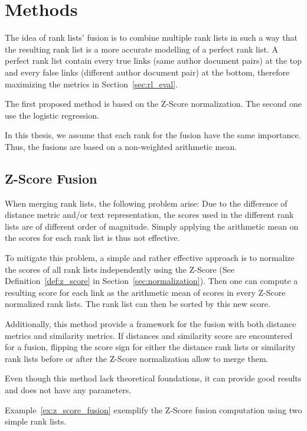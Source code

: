 \section{Methods \label{sec:rank_lists_fusion}}

The idea of rank lists' fusion is to combine multiple rank lists in such a way that the resulting rank list is a more accurate modelling of a perfect rank list.
A perfect rank list contain every true links (same author document pairs) at the top and every false links (different author document pair) at the bottom, therefore maximizing the metrics in Section~\ref{sec:rl_eval}.

The first proposed method is based on the Z-Score normalization.
The second one use the logistic regression.

In this thesis, we assume that each rank for the fusion have the same importance.
Thus, the fusions are based on a non-weighted arithmetic mean.

\subsection{Z-Score Fusion}

When merging rank lists, the following problem arise: Due to the difference of distance metric and/or text representation, the scores used in the different rank lists are of different order of magnitude.
Simply applying the arithmetic mean on the scores for each rank list is thus not effective.

To mitigate this problem, a simple and rather effective approach is to normalize the scores of all rank lists independently using the Z-Score (See Definition~\ref{def:z_score} in Section~\ref{sec:normalization}).
Then one can compute a resulting score for each link as the arithmetic mean of scores in every Z-Score normalized rank lists.
The rank list can then be sorted by this new score.

Additionally, this method provide a framework for the fusion with both distance metrics and similarity metrics.
If distances and similarity score are encountered for a fusion, flipping the score sign for either the distance rank lists or similarity rank lists before or after the Z-Score normalization allow to merge them.

Even though this method lack theoretical foundations, it can provide good results and does not have any parameters.

Example~\ref{ex:z_score_fusion} exemplify the Z-Score fusion computation using two simple rank lists.

